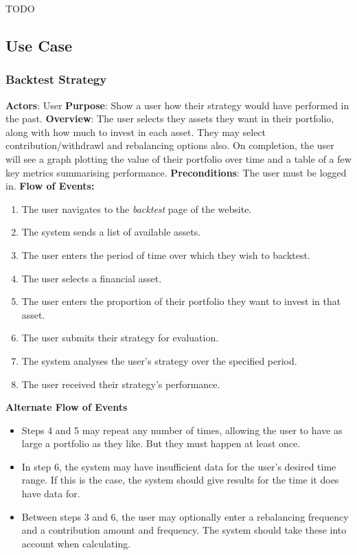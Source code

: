 \documentclass[main.tex]{subfiles}
\begin{document}
TODO

\subsection{Use Case}
\newpage

\subsubsection{Backtest Strategy}

\textbf{Actors}: User
\newline
\newline
\textbf{Purpose}: Show a user how their strategy would have performed in the past.
\newline
\newline
\textbf{Overview}: The user selects they assets they want in their portfolio, along with how much to invest in each asset. They may select contribution/withdrawl and rebalancing options also. On completion, the user will see a graph plotting the value of their portfolio over time and a table of a few key metrics summarising performance.
\newline
\newline
\textbf{Preconditions}: The user must be logged in.
\newline
\newline
\textbf{Flow of Events:}
\newline
\begin{enumerate}
	\item The user navigates to the \textit{backtest} page of the website.
	\item The system sends a list of available assets.
	\item The user enters the period of time over which they wish to backtest.
	\item The user selects a financial asset.
	\item The user enters the proportion of their portfolio they want to invest in that asset.
	\item The user submits their strategy for evaluation.
	\item The system analyses the user's strategy over the specified period.
	\item The user received their strategy's performance.
\end{enumerate}
\textbf{Alternate Flow of Events}
\begin{itemize}
	\item Steps 4 and 5 may repeat any number of times, allowing the user to have as large a portfolio as they like. But they must happen at least once.
	\item In step 6, the system may have insufficient data for the user's desired time range. If this is the case, the system should give results for the time it does have data for.
	\item Between steps 3 and 6, the user may optionally enter a rebalancing frequency and a contribution amount and frequency. The system should take these into account when calculating.
\end{itemize}
\end{document}

